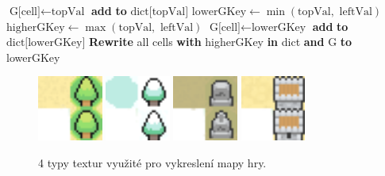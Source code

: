 \begin{algorithm}[hb]
\begin{algorithmic}[1]
        \Statex \textcolor{blue}{}
             \textcolor{blue}{}
                \State $\text{G[cell]} \gets \text{topVal}$
                \State \textbf{add}  \textbf{to} $\text{dict[topVal]}$
            \vspace{0.4em}
            \Else \textcolor{blue}{}
                \State $\text{lowerGKey} \gets \min(\text{topVal}, \text{ leftVal})$
                \State $\text{higherGKey} \gets \max(\text{topVal}, \text{ leftVal})$
                \vspace{0.2em} 
                \State $\text{G[cell]} \gets \text{lowerGKey}$
                \State \textbf{add}  \textbf{to} $\text{dict[lowerGKey]}$
                \vspace{0.3em}
                \State \textbf{Rewrite} all cells \textbf{with} higherGKey \textbf{in} dict \textbf{and} G \textbf{to} lowerGKey
            \EndIf
        \EndIf
    \EndFor
\EndFor
\end{algorithmic}
\end{algorithm}

\begin{figure}[H]
    \centering
    \includegraphics[width=0.19\textwidth]{obrazky-figures/ch4/forest.png}\hspace{0.2cm}
    \includegraphics[width=0.19\textwidth]{obrazky-figures/ch4/winter.png}\hspace{0.2cm}
    \includegraphics[width=0.19\textwidth]{obrazky-figures/ch4/graves.png}\hspace{0.2cm}
    \includegraphics[width=0.19\textwidth]{obrazky-figures/ch4/castle.png}
    \caption{4 typy textur využité pro vykreslení mapy hry.}
    \label{fig:map_textures}
\end{figure}

